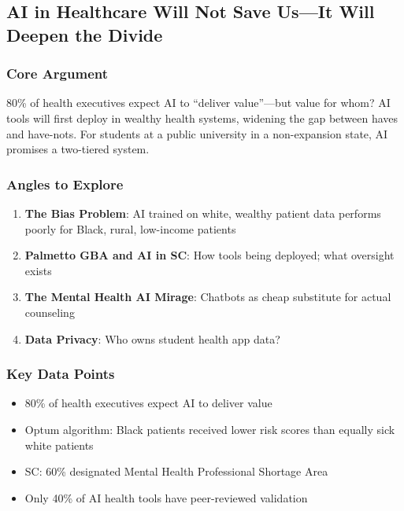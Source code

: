 \documentclass[11pt,letterpaper]{article}
\begin{document}
\newpage
\subsection{AI in Healthcare Will Not Save Us---It Will Deepen the Divide}

\subsubsection*{Core Argument}
80\% of health executives expect AI to ``deliver value''---but value for whom? AI tools will first deploy in wealthy health systems, widening the gap between haves and have-nots. For students at a public university in a non-expansion state, AI promises a two-tiered system.

\subsubsection*{Angles to Explore}
\begin{enumerate}[noitemsep]
    \item \textbf{The Bias Problem}: AI trained on white, wealthy patient data performs poorly for Black, rural, low-income patients
    \item \textbf{Palmetto GBA and AI in SC}: How tools being deployed; what oversight exists
    \item \textbf{The Mental Health AI Mirage}: Chatbots as cheap substitute for actual counseling
    \item \textbf{Data Privacy}: Who owns student health app data?
\end{enumerate}

\subsubsection*{Key Data Points}
\begin{itemize}[noitemsep]
    \item 80\% of health executives expect AI to deliver value
    \item Optum algorithm: Black patients received lower risk scores than equally sick white patients
    \item SC: 60\% designated Mental Health Professional Shortage Area
    \item Only 40\% of AI health tools have peer-reviewed validation
\end{itemize}
\end{document}
